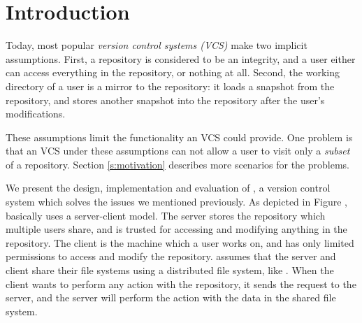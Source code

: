 \section{Introduction}
\label{s:intro}

Today, most popular  \emph{version control
systems (VCS)} make two implicit assumptions. First, a repository is considered to be
an integrity, and a user either can access everything in the repository, or
nothing at all. Second, the working directory of a user is a mirror to the
repository: it loads a snapshot from the repository, and stores another snapshot
into the repository after the user's modifications. 

These assumptions limit the functionality an VCS could provide.
One problem is that an VCS under these assumptions can not allow a user to
visit only a \emph{subset} of a repository. Section \ref{s:motivation} describes
more scenarios for the problems.


We present the design, implementation and evaluation of \sys, a version control
system which solves the issues we mentioned previously. As depicted in Figure
, \sys basically
uses a server-client model. The server stores the repository which multiple
users share, and is trusted for accessing and modifying anything in the
repository. The client is the machine which a user works on, and has only
limited permissions to access and modify the repository. \sys assumes that the
server and client share their file systems using a distributed file system, like
\nfs. %
When the client wants to perform any action with the repository, it sends the
request to the server, and the server will perform the action with the data in
the shared file system. 


